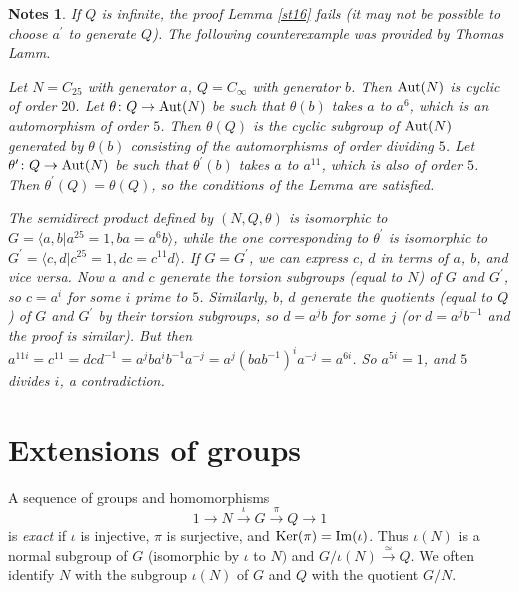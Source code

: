 \documentclass[a4paper,11pt,final,openany]{memoir}%
\newtheorem*{nt}{Notes}
\theoremstyle{nonumberplain}
\begin{document}
\begin{nt}
If $Q$ is infinite, the proof Lemma \ref{st16} fails (it may not be possible
to choose $a^{\prime}$ to generate $Q$). The following counterexample was
provided by Thomas Lamm.

Let $N=C_{25}$ with generator $a$, $Q=C_{\infty}$ with generator $b$. Then
$\operatorname{Aut}(N)$ is cyclic of order $20$. Let $\theta\colon Q\rightarrow\operatorname{Aut}(N)$ be
such that $\theta(b)$ takes $a$ to $a^{6}$, which is an automorphism of order
$5$. Then $\theta(Q)$ is the cyclic subgroup of $\operatorname{Aut}(N)$ generated by
$\theta(b)$ consisting of the automorphisms of order dividing $5$. Let
$\theta^{\prime}\colon Q\rightarrow\operatorname{Aut}(N)$ be such that $\theta^{\prime}(b)$
takes $a$ to $a^{11}$, which is also of order $5$. Then $\theta^{\prime
}(Q)=\theta(Q)$, so the conditions of the Lemma are satisfied.

The semidirect product defined by $(N,Q,\theta)$ is isomorphic to $G=\langle
a,b|a^{25}=1,ba=a^{6}b\rangle$, while the one corresponding to $\theta
^{\prime}$ is isomorphic to $G^{\prime}=\langle c,d|c^{25}=1,dc=c^{11}%
d\rangle$. If $G=G^{\prime}$, we can express $c$, $d$ in terms of $a$, $b$,
and vice versa. Now $a$ and $c$ generate the torsion subgroups (equal to $N$)
of $G$ and $G^{\prime}$, so $c=a^{i}$ for some $i$ prime to $5$. Similarly,
$b$, $d$ generate the quotients (equal to $Q$) of $G$ and $G^{\prime}$ by
their torsion subgroups, so $d=a^{j}b$ for some $j$ (or $d=a^{j}b^{-1}$ and
the proof is similar). But then $a^{11i}=c^{11}=dcd^{-1}=a^{j}ba^{i}%
b^{-1}a^{-j}=a^{j}(bab^{-1})^{i}a^{-j}=a^{6i}$. So $a^{5i}=1$, and $5$ divides
$i$, a contradiction.
\end{nt}

\section{Extensions of groups}

A sequence of groups and homomorphisms
\begin{equation}
1\rightarrow N\overset{\iota}{\rightarrow}G\overset{\pi}{\rightarrow
}Q\rightarrow1 \label{e27}%
\end{equation}
is \emph{exact}%
if $\iota$ is injective, $\pi$ is surjective, and $\operatorname{Ker}(\pi)=\operatorname{Im}(\iota)$. Thus
$\iota(N)$ is a normal subgroup of $G$ (isomorphic by $\iota$ to $N)$ and
$G/\iota(N)\overset{\simeq}{\longrightarrow}Q$. We often identify $N$ with the
subgroup $\iota(N)$ of $G$ and $Q$ with the quotient $G/N.$
\end{document}
